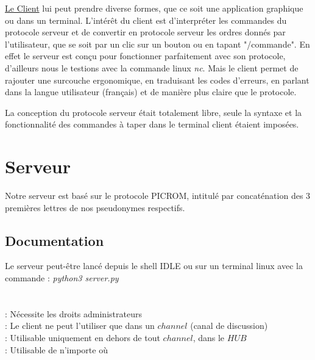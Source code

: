 \documentclass[12pt]{article}
\begin{document}
\underline{Le Client} lui peut prendre diverse formes, que ce soit une application graphique
ou dans un terminal. L'intérêt du client est d'interpréter les commandes du protocole serveur
et de convertir en protocole serveur les ordres donnés par l'utilisateur, que se soit par un
clic sur un bouton ou en tapant "/commande". En effet le serveur est conçu pour fonctionner
parfaitement avec son protocole, d'ailleurs nous le testions avec la commande linux \emph{nc}.
Mais le client permet de rajouter une surcouche ergonomique, en traduisant les codes d'erreurs,
en parlant dans la langue utilisateur (français) et de manière plus claire que le protocole.

La conception du protocole serveur était totalement libre, seule la syntaxe et
la fonctionnalité des commandes
à taper dans le terminal client étaient imposées.


\section{Serveur}
Notre serveur est basé sur le protocole PICROM, intitulé par concaténation des
3 premières lettres de nos pseudonymes respectifs.

\subsection{Documentation}
Le serveur peut-être lancé depuis le shell IDLE ou sur un terminal linux avec
la commande : \emph{python3 server.py}
\\

\\

\\ : Nécessite les droits administrateurs
\\ : Le client ne peut l'utiliser que dans un $channel$ (canal de discussion)
\\ : Utilisable uniquement en dehors de tout $channel$, dans le $HUB$
\\ : Utilisable de n'importe où
\end{document}
